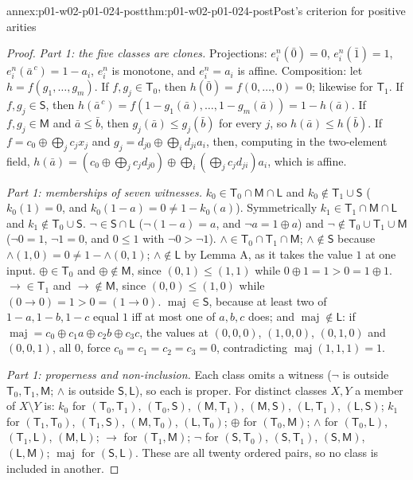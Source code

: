 \begin{annexitem}{annex:p01-w02-p01-024-post}{thm:p01-w02-p01-024-post}{Post's criterion for positive arities}
\begin{proof}
\emph{Part 1: the five classes are clones.}  Projections:
\(e^n_i(\bar0)=0\), \(e^n_i(\bar1)=1\),
\(e^n_i(\bar a^{\,c})=1-a_i\), \(e^n_i\) is monotone, and
\(e^n_i=a_i\) is affine.  Composition: let \(h=f(g_1,\ldots,g_m)\).  If
\(f,g_j\in\mathsf T_0\), then \(h(\bar0)=f(0,\ldots,0)=0\); likewise for
\(\mathsf T_1\).  If \(f,g_j\in\mathsf S\), then
\(h(\bar a^{\,c})=f(1-g_1(\bar a),\ldots,1-g_m(\bar a))
=1-h(\bar a)\).  If \(f,g_j\in\mathsf M\) and \(\bar a\leq\bar b\), then
\(g_j(\bar a)\leq g_j(\bar b)\) for every \(j\), so
\(h(\bar a)\leq h(\bar b)\).  If \(f=c_0\oplus\bigoplus_jc_jx_j\) and
\(g_j=d_{j0}\oplus\bigoplus_id_{ji}a_i\), then, computing in the
two-element field,
\(h(\bar a)=(c_0\oplus\bigoplus_jc_jd_{j0})\oplus\bigoplus_i
(\bigoplus_jc_jd_{ji})a_i\), which is affine.

\emph{Part 1: memberships of seven witnesses.}
\(k_0\in\mathsf T_0\cap\mathsf M\cap\mathsf L\) and
\(k_0\notin\mathsf T_1\cup\mathsf S\) (\(k_0(1)=0\), and
\(k_0(1-a)=0\neq1-k_0(a)\)).  Symmetrically
\(k_1\in\mathsf T_1\cap\mathsf M\cap\mathsf L\) and
\(k_1\notin\mathsf T_0\cup\mathsf S\).  \(\neg\in\mathsf S\cap\mathsf L\)
(\(\neg(1-a)=a\), and \(\neg a=1\oplus a\)) and
\(\neg\notin\mathsf T_0\cup\mathsf T_1\cup\mathsf M\) (\(\neg0=1\),
\(\neg1=0\), and \(0\leq1\) with \(\neg0>\neg1\)).
\(\land\in\mathsf T_0\cap\mathsf T_1\cap\mathsf M\); \(\land\notin\mathsf S\)
because \(\land(1,0)=0\neq1-\land(0,1)\); \(\land\notin\mathsf L\) by
Lemma A, as it takes the value \(1\) at one input.
\(\oplus\in\mathsf T_0\) and \(\oplus\notin\mathsf M\), since
\((0,1)\leq(1,1)\) while \(0\oplus1=1>0=1\oplus1\).
\(\to\in\mathsf T_1\) and \(\to\notin\mathsf M\), since
\((0,0)\leq(1,0)\) while \((0\to0)=1>0=(1\to0)\).
\(\operatorname{maj}\in\mathsf S\), because at least two of
\(1-a,1-b,1-c\) equal \(1\) iff at most one of \(a,b,c\) does; and
\(\operatorname{maj}\notin\mathsf L\): if
\(\operatorname{maj}=c_0\oplus c_1a\oplus c_2b\oplus c_3c\), the values at
\((0,0,0)\), \((1,0,0)\), \((0,1,0)\) and \((0,0,1)\), all \(0\), force
\(c_0=c_1=c_2=c_3=0\), contradicting
\(\operatorname{maj}(1,1,1)=1\).

\emph{Part 1: properness and non-inclusion.}  Each class omits a witness
(\(\neg\) is outside \(\mathsf T_0,\mathsf T_1,\mathsf M\); \(\land\) is
outside \(\mathsf S,\mathsf L\)), so each is proper.  For distinct classes
\(X,Y\) a member of \(X\setminus Y\) is:
\(k_0\) for \((\mathsf T_0,\mathsf T_1)\), \((\mathsf T_0,\mathsf S)\),
\((\mathsf M,\mathsf T_1)\), \((\mathsf M,\mathsf S)\),
\((\mathsf L,\mathsf T_1)\), \((\mathsf L,\mathsf S)\);
\(k_1\) for \((\mathsf T_1,\mathsf T_0)\), \((\mathsf T_1,\mathsf S)\),
\((\mathsf M,\mathsf T_0)\), \((\mathsf L,\mathsf T_0)\);
\(\oplus\) for \((\mathsf T_0,\mathsf M)\);
\(\land\) for \((\mathsf T_0,\mathsf L)\), \((\mathsf T_1,\mathsf L)\),
\((\mathsf M,\mathsf L)\);
\(\to\) for \((\mathsf T_1,\mathsf M)\);
\(\neg\) for \((\mathsf S,\mathsf T_0)\), \((\mathsf S,\mathsf T_1)\),
\((\mathsf S,\mathsf M)\), \((\mathsf L,\mathsf M)\);
\(\operatorname{maj}\) for \((\mathsf S,\mathsf L)\).
These are all twenty ordered pairs, so no class is included in another.


\end{proof}
\end{annexitem}
